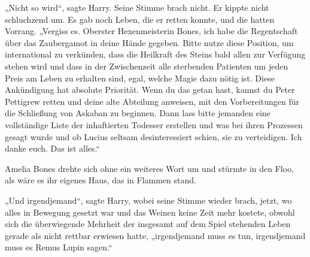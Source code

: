 „Nicht so wird“, sagte Harry. Seine Stimme brach nicht. Er kippte nicht schluchzend um.
Es gab noch Leben, die er retten konnte, und die hatten Vorrang. „Vergiss es. Oberster Hexenmeisterin Bones, ich habe die Regentschaft über das Zaubergamot in deine Hände gegeben. Bitte nutze diese Position, um international zu verkünden, dass die Heilkraft des Steins bald allen zur Verfügung stehen wird und dass in der Zwischenzeit alle sterbenden Patienten um jeden Preis am Leben zu erhalten sind, egal, welche Magie dazu nötig ist. Diese Ankündigung hat absolute Priorität. Wenn du das getan hast, kannst du Peter Pettigrew retten und deine alte Abteilung anweisen, mit den Vorbereitungen für die Schließung von Askaban zu beginnen. Dann lass bitte jemanden eine vollständige Liste der inhaftierten Todesser erstellen und was bei ihren Prozessen gesagt wurde und ob Lucius seltsam desinteressiert schien, sie zu verteidigen. Ich danke euch. Das ist alles.“

Amelia Bones drehte sich ohne ein weiteres Wort um und stürmte in den Floo, als wäre es ihr eigenes Haus, das in Flammen stand.

„Und irgendjemand“, sagte Harry, wobei seine Stimme wieder brach, jetzt, wo alles in Bewegung gesetzt war und das Weinen keine Zeit mehr kostete, obwohl sich die überwiegende Mehrheit der insgesamt auf dem Spiel stehenden Leben gerade als nicht rettbar erwiesen hatte, „irgendjemand muss es tun, irgendjemand muss es Remus Lupin sagen.“

